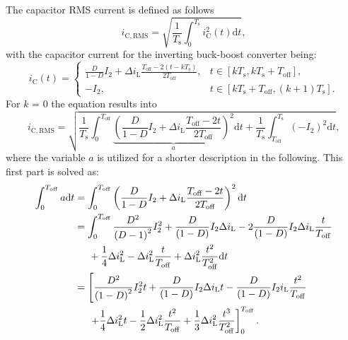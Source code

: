 
\begin{solutionblock}

    The capacitor RMS current is defined as follows
    \begin{equation}
        i_{\mathrm{C,RMS}} = \sqrt{\frac{1}{T_{\mathrm{s}}} \int_{0}^{T_{\mathrm{s}}}i_{\mathrm{C}}^2(t)\mathrm{d}t},
    \end{equation}
    with the capacitor current for the inverting buck-boost converter being:
    \begin{equation}
        {i_\mathrm{C}(t) = \begin{cases}
            \frac{D}{1-D}I_2 + \Delta i_\mathrm{L} \frac{T_\mathrm{off}-2(t-kT_\mathrm{s})}{2T_\mathrm{off}}, & t\in [k T_\mathrm{s}, k T_\mathrm{s} + T_\mathrm{off}],\\
            -I_2, & t\in [k T_\mathrm{s}+ T_\mathrm{off}, (k+1) T_\mathrm{s}].
        \end{cases}}
    \end{equation}
    For $k$ = 0 the equation results into
    \begin{equation}
        i_{\mathrm{C,RMS}} = \sqrt{\frac{1}{T_{\mathrm{s}}} \int_{0}^{T_{\mathrm{off}}} \underbrace{\left( \frac{D}{1-D}I_2 + \Delta i_\mathrm{L} \frac{T_\mathrm{off}-2t}{2T_\mathrm{off}}\right)^2}_{a} \mathrm{d}t+ \frac{1}{T_{\mathrm{s}}}\int_{T_{\mathrm{off}}}^{T_{\mathrm{s}}} \left(-I_2 \right)^2 \mathrm{d}t},
    \end{equation}
    where the variable $a$ is utilized for a shorter description in the following. This first part is solved as:
    \begin{align}
        \begin{split}
        \int_{0}^{T_{\mathrm{off}}} a \mathrm{d}t &= \int_{0}^{T_{\mathrm{off}}} \left( \frac{D}{1-D}I_2 + \Delta i_\mathrm{L} \frac{T_\mathrm{off}-2t}{2T_\mathrm{off}}\right)^2 \mathrm{d}t \\
        &= \int_{0}^{T_{\mathrm{off}}} \frac{D^2}{\left(D-1\right)^2}I_2^2 + \frac{D}{(1-D)}I_2 \Delta i_{\mathrm{L}} - 2 \frac{D}{(1-D)} I_2 \Delta i_{\mathrm{L}} \frac{t}{T_{\mathrm{off}}} \\ &\hspace{5mm} + \frac{1}{4} \Delta i_{\mathrm{L}}^2 - \Delta i_{\mathrm{L}}^2 \frac{t}{T_{\mathrm{off}}} + \Delta i_{\mathrm{L}}^2 \frac{t^2}{T_{\mathrm{off}}^2} \mathrm{d}t \\
        & = \left[\frac{D^2}{\left(1-D\right)^2} I_2^2 t + \frac{D}{(1-D)}I_2 \Delta i_{\mathrm{L}} t - \frac{D}{(1-D)} I_2 i_{\mathrm{L}} \frac{t^2}{T_{\mathrm{off}}} \right. \\ & \left. \hspace{5mm} + \frac{1}{4}\Delta i_{\mathrm{L}}^2 t - \frac{1}{2} \Delta i_{\mathrm{L}}^2 \frac{t^2}{T_{\mathrm{off}}} + \frac{1}{3 }\Delta i_{\mathrm{L}}^2 \frac{t^3}{T_{\mathrm{off}}^2} \right]_{0}^{T_{\mathrm{off}}}.

\end{split}
\end{align}
\end{solutionblock}
